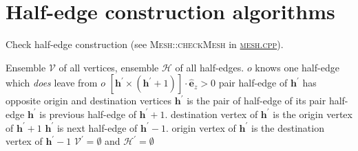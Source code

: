 \documentclass[aps, superscriptaddress, notitlepage]{revtex4-1}
\begin{document}
% 

\appendix

\newpage
\section{Half-edge construction algorithms}

\begin{algorithm}[H]
\caption{Check half-edge construction (see \textsc{Mesh::checkMesh} in \href{../mesh.cpp}{\textsc{mesh.cpp}}).}
\label{alg:check}
\begin{algorithmic}[1]
\REQUIRE Ensemble $\mathcal{V}$ of all vertices, ensemble $\mathcal{H}$ of all half-edges.
     
    \ENDIF
     
     
         
            \ASSERT $o$ knows one half-edge which \textit{does} leave from $o$
        \ENDIF
        \ASSERT $[\boldsymbol{h}^{\prime} \times (\boldsymbol{h}^{\prime} + 1)] \cdot \hat{\boldsymbol{e}}_z > 0$  \label{alg:checkori}
        \ASSERT pair half-edge of $\boldsymbol{h}^{\prime}$ has opposite origin and destination vertices 
        \ASSERT $\boldsymbol{h}^{\prime}$ is the pair of half-edge of its pair half-edge
        \ASSERT $\boldsymbol{h}^{\prime}$ is previous half-edge of $\boldsymbol{h}^{\prime} + 1$. 
        \ASSERT destination vertex of $\boldsymbol{h}^{\prime}$ is the origin vertex of $\boldsymbol{h}^{\prime} + 1$
        \ASSERT $\boldsymbol{h}^{\prime}$ is next half-edge of $\boldsymbol{h}^{\prime} - 1$. 
        \ASSERT origin vertex of $\boldsymbol{h}^{\prime}$ is the destination vertex of $\boldsymbol{h}^{\prime} - 1$
    \ENDFOR
\ENDFOR
\ASSERT $\mathcal{V}^{\prime} = \emptyset$ and $\mathcal{H}^{\prime} = \emptyset$
\end{algorithmic}
\end{algorithm}
\end{document}
